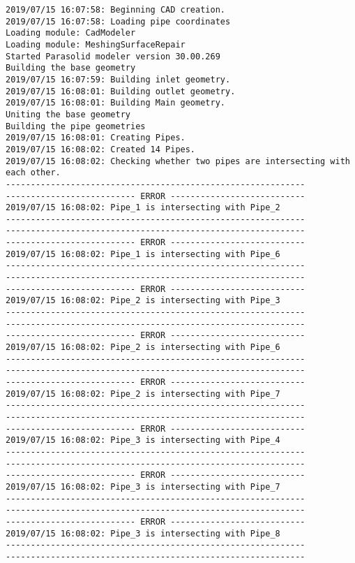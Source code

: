 \documentclass{article}
\begin{document}
{\tiny 
\begin{verbatim}
2019/07/15 16:07:58: Beginning CAD creation.
2019/07/15 16:07:58: Loading pipe coordinates
Loading module: CadModeler
Loading module: MeshingSurfaceRepair
Started Parasolid modeler version 30.00.269
Building the base geometry
2019/07/15 16:07:59: Building inlet geometry.
2019/07/15 16:08:01: Building outlet geometry.
2019/07/15 16:08:01: Building Main geometry.
Uniting the base geometry
Building the pipe geometries
2019/07/15 16:08:01: Creating Pipes.
2019/07/15 16:08:02: Created 14 Pipes.
2019/07/15 16:08:02: Checking whether two pipes are intersecting with each other.
------------------------------------------------------------
-------------------------- ERROR ---------------------------
2019/07/15 16:08:02: Pipe_1 is intersecting with Pipe_2
------------------------------------------------------------
------------------------------------------------------------
-------------------------- ERROR ---------------------------
2019/07/15 16:08:02: Pipe_1 is intersecting with Pipe_6
------------------------------------------------------------
------------------------------------------------------------
-------------------------- ERROR ---------------------------
2019/07/15 16:08:02: Pipe_2 is intersecting with Pipe_3
------------------------------------------------------------
------------------------------------------------------------
-------------------------- ERROR ---------------------------
2019/07/15 16:08:02: Pipe_2 is intersecting with Pipe_6
------------------------------------------------------------
------------------------------------------------------------
-------------------------- ERROR ---------------------------
2019/07/15 16:08:02: Pipe_2 is intersecting with Pipe_7
------------------------------------------------------------
------------------------------------------------------------
-------------------------- ERROR ---------------------------
2019/07/15 16:08:02: Pipe_3 is intersecting with Pipe_4
------------------------------------------------------------
------------------------------------------------------------
-------------------------- ERROR ---------------------------
2019/07/15 16:08:02: Pipe_3 is intersecting with Pipe_7
------------------------------------------------------------
------------------------------------------------------------
-------------------------- ERROR ---------------------------
2019/07/15 16:08:02: Pipe_3 is intersecting with Pipe_8
------------------------------------------------------------
------------------------------------------------------------

\end{verbatim}}
\end{document}
